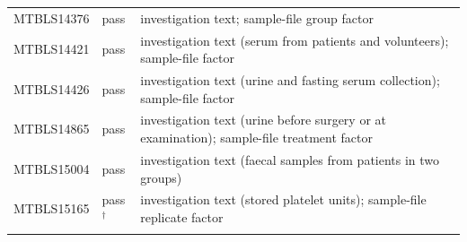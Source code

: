 \documentclass[sn-basic]{sn-jnl}
\begin{document}
\begin{table}[!ht]
\begin{tabular*}{\textwidth}{@{\extracolsep\fill}llp{}}
MTBLS14376 & pass & investigation text; sample-file group factor \\
MTBLS14421 & pass & investigation text (serum from patients and volunteers); sample-file factor \\
MTBLS14426 & pass & investigation text (urine and fasting serum collection); sample-file factor \\
MTBLS14865 & pass & investigation text (urine before surgery or at examination); sample-file treatment factor \\
MTBLS15004 & pass & investigation text (faecal samples from patients in two groups) \\
MTBLS15165 & pass$^{\dagger}$ & investigation text (stored platelet units); sample-file replicate factor \\
\botrule
\end{tabular*}
\end{table}
\end{document}
